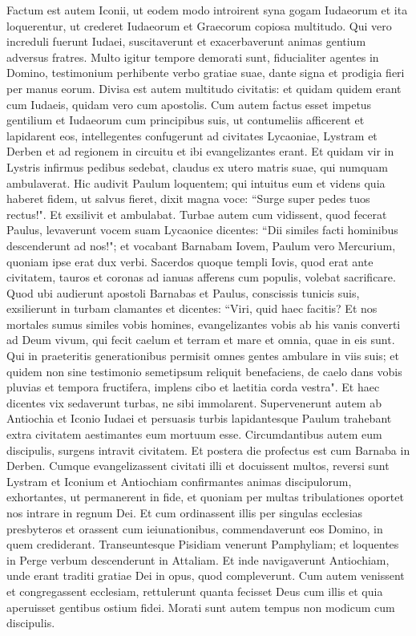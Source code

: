 \begin{biblechapter}  
\verse Factum est autem Iconii, ut eodem modo introirent syna gogam Iudaeorum et ita loquerentur, ut crederet Iudaeorum et Graecorum copiosa multitudo. 
\verse Qui vero increduli fuerunt Iudaei, suscitaverunt et exacerbaverunt animas gentium adversus fratres. 
\verse Multo igitur tempore demorati sunt, fiducialiter agentes in Domino, testimonium perhibente verbo gratiae suae, dante signa et prodigia fieri per manus eorum. 
\verse Divisa est autem multitudo civitatis: et quidam quidem erant cum Iudaeis, quidam vero cum apostolis. 
\verse Cum autem factus esset impetus gentilium et Iudaeorum cum principibus suis, ut contumeliis afficerent et lapidarent eos, 
\verse intellegentes confugerunt ad civitates Lycaoniae, Lystram et Derben et ad regionem in circuitu 
\verse et ibi evangelizantes erant. 
\verse Et quidam vir in Lystris infirmus pedibus sedebat, claudus ex utero matris suae, qui numquam ambulaverat. 
\verse Hic audivit Paulum loquentem; qui intuitus eum et videns quia haberet fidem, ut salvus fieret, 
\verse dixit magna voce: “Surge super pedes tuos rectus!". Et exsilivit et ambulabat. 
\verse Turbae autem cum vidissent, quod fecerat Paulus, levaverunt vocem suam Lycaonice dicentes: “Dii similes facti hominibus descenderunt ad nos!"; 
\verse et vocabant Barnabam Iovem, Paulum vero Mercurium, quoniam ipse erat dux verbi. 
\verse Sacerdos quoque templi Iovis, quod erat ante civitatem, tauros et coronas ad ianuas afferens cum populis, volebat sacrificare. 
\verse Quod ubi audierunt apostoli Barnabas et Paulus, conscissis tunicis suis, exsilierunt in turbam clamantes 
\verse et dicentes: “Viri, quid haec facitis? Et nos mortales sumus similes vobis homines, evangelizantes vobis ab his vanis converti ad Deum vivum, qui fecit caelum et terram et mare et omnia, quae in eis sunt. 
\verse Qui in praeteritis generationibus permisit omnes gentes ambulare in viis suis; 
\verse et quidem non sine testimonio semetipsum reliquit benefaciens, de caelo dans vobis pluvias et tempora fructifera, implens cibo et laetitia corda vestra".  
\verse Et haec dicentes vix sedaverunt turbas, ne sibi immolarent. 
\verse Supervenerunt autem ab Antiochia et Iconio Iudaei et persuasis turbis lapidantesque Paulum trahebant extra civitatem aestimantes eum mortuum esse.  
\verse Circumdantibus autem eum discipulis, surgens intravit civitatem. Et postera die profectus est cum Barnaba in Derben. 
\verse Cumque evangelizassent civitati illi et docuissent multos, reversi sunt Lystram et Iconium et Antiochiam 
\verse confirmantes animas discipulorum, exhortantes, ut permanerent in fide, et quoniam per multas tribulationes oportet nos intrare in regnum Dei. 
\verse Et cum ordinassent illis per singulas ecclesias presbyteros et orassent cum ieiunationibus, commendaverunt eos Domino, in quem crediderant. 
\verse Transeuntesque Pisidiam venerunt Pamphyliam; 
\verse et loquentes in Perge verbum descenderunt in Attaliam. 
\verse Et inde navigaverunt Antiochiam, unde erant traditi gratiae Dei in opus, quod compleverunt. 
\verse Cum autem venissent et congregassent ecclesiam, rettulerunt quanta fecisset Deus cum illis et quia aperuisset gentibus ostium fidei. 
\verse Morati sunt autem tempus non modicum cum discipulis. 
\end{biblechapter}

